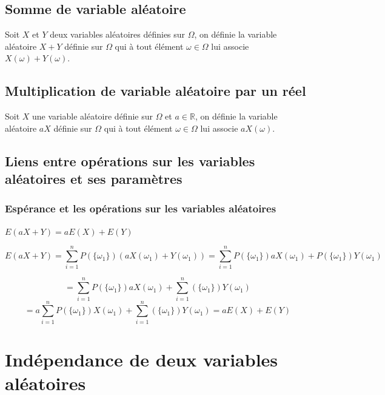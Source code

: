 \documentclass[french]{book}
\newcommand{\ds}{\displaystyle}
\begin{document}
\subsection{Somme de variable aléatoire}

\begin{defn}
Soit $X$ et $Y$ deux variables aléatoires définies sur $\Omega$, on définie la variable aléatoire $X+Y$ définie sur $\Omega$ qui à tout élément $\omega \in \Omega$ lui associe $X(\omega)+Y(\omega)$.
\end{defn}

\subsection{Multiplication de variable aléatoire par un réel}
\begin{defn}
Soit $X$ une variable aléatoire définie sur $\Omega$ et $a\in \mathbb{R}$, on définie la variable aléatoire $aX$ définie sur $\Omega$ qui à tout élément $\omega \in \Omega$ lui associe $aX(\omega)$.
\end{defn}
\subsection{Liens entre opérations sur les variables aléatoires et ses paramètres}

\subsubsection{Espérance et les opérations sur les variables aléatoires}
\begin{prop}
$E(aX+Y)=aE(X)+E(Y)$
\end{prop}

\begin{demo}%

$$E(aX+Y)=\ds\sum_{i=1}^nP(\{\omega_1\})(aX(\omega_1) + Y(\omega_1) ) = \ds\sum_{i=1}^nP(\{\omega_1\})aX(\omega_1) + P(\{\omega_1\})Y(\omega_1) $$

$$=\ds\sum_{i=1}^n P(\{\omega_1\})aX(\omega_1) + \sum_{i=1}^n (\{\omega_1\})Y(\omega_1) $$
$$= \ds a\sum_{i=1}^n P(\{\omega_1\})X(\omega_1) + \sum_{i=1}^n (\{\omega_1\})Y(\omega_1) =aE(X)+E(Y)$$ 


\end{demo}
\section{Indépendance de deux variables aléatoires}
\end{document}
